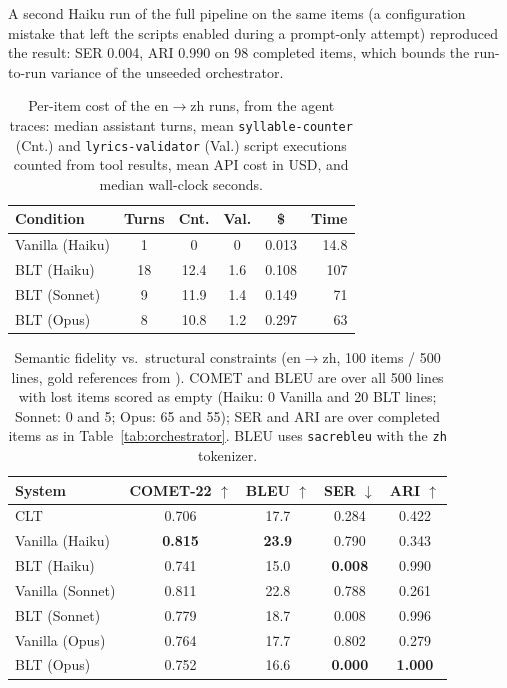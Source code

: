 \documentclass[11pt]{article}
\begin{document}
A second Haiku run of the full pipeline on the same items (a configuration mistake that left the scripts enabled during a prompt-only attempt) reproduced the result: SER 0.004, ARI 0.990 on 98 completed items, which bounds the run-to-run variance of the unseeded orchestrator.

\begin{table}[h]
\centering
\small
\setlength{\tabcolsep}{3pt}
\begin{tabular}{@{}lccccr@{}}
\toprule
\textbf{Condition} & \textbf{Turns} & \textbf{Cnt.} & \textbf{Val.} & \textbf{\$} & \textbf{Time} \\
\midrule
Vanilla (Haiku) & 1 & 0 & 0 & 0.013 & 14.8 \\
BLT (Haiku) & 18 & 12.4 & 1.6 & 0.108 & 107 \\
BLT (Sonnet) & 9 & 11.9 & 1.4 & 0.149 & 71 \\
BLT (Opus) & 8 & 10.8 & 1.2 & 0.297 & 63 \\
\end{tabular}
\caption{Per-item cost of the en$\rightarrow$zh runs, from the agent traces: median assistant turns, mean \texttt{syllable-counter} (Cnt.) and \texttt{lyrics-validator} (Val.) script executions counted from tool results, mean API cost in USD, and median wall-clock seconds.}
\label{tab:tool-usage}
\end{table}

\begin{table}[h]
\centering
\small
\setlength{\tabcolsep}{3pt}
\begin{tabular}{@{}lcccc@{}}
\toprule
\textbf{System} & \textbf{COMET-22} $\uparrow$ & \textbf{BLEU} $\uparrow$ & \textbf{SER} $\downarrow$ & \textbf{ARI} $\uparrow$ \\
\midrule
CLT              & 0.706 & 17.7 & 0.284 & 0.422 \\
Vanilla (Haiku)  & \textbf{0.815} & \textbf{23.9} & 0.790 & 0.343 \\
BLT (Haiku)      & 0.741 & 15.0 & \textbf{0.008} & 0.990 \\
Vanilla (Sonnet) & 0.811 & 22.8 & 0.788 & 0.261 \\
BLT (Sonnet)     & 0.779 & 18.7 & 0.008 & 0.996 \\
Vanilla (Opus)   & 0.764 & 17.7 & 0.802 & 0.279 \\
BLT (Opus)       & 0.752 & 16.6 & \textbf{0.000} & \textbf{1.000} \\
\bottomrule
\end{tabular}
\caption{Semantic fidelity vs.\ structural constraints (en$\rightarrow$zh, 100 items / 500 lines, gold references from \citet{ou-etal-2023-songs}). COMET and BLEU are over all 500 lines with lost items scored as empty (Haiku: 0 Vanilla and 20 BLT lines; Sonnet: 0 and 5; Opus: 65 and 55); SER and ARI are over completed items as in Table~\ref{tab:orchestrator}. BLEU uses \texttt{sacrebleu} with the \texttt{zh} tokenizer.}
\label{tab:semantic}
\end{table}
\end{document}
